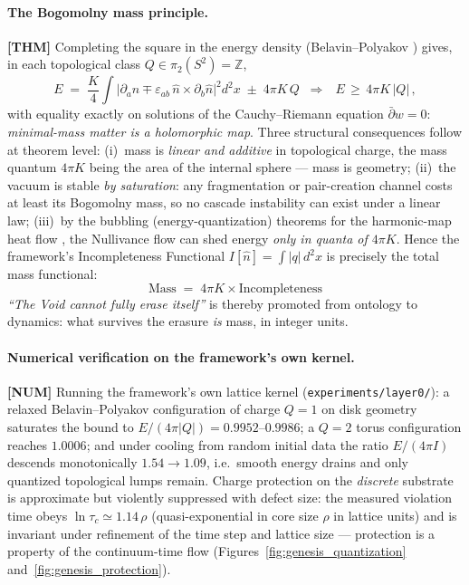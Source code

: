 \paragraph{The Bogomolny mass principle.} \textbf{[THM]} Completing the square in the energy
density (Belavin--Polyakov \cite{BP1975}) gives, in each topological class
$Q\in\pi_2(S^2)=\mathbb{Z}$,
\begin{equation}
E \;=\; \frac{K}{4}\!\int\! \big|\partial_a \hat n \mp \varepsilon_{ab}\,\hat n\times\partial_b \hat n\big|^2 d^2x
\;\pm\; 4\pi K\, Q
\;\;\Longrightarrow\;\;
\boxed{\,E \,\ge\, 4\pi K\,|Q|\,},
\label{eq:bogomolny}
\end{equation}
with equality exactly on solutions of the Cauchy--Riemann equation $\bar\partial w=0$:
\emph{minimal-mass matter is a holomorphic map}. Three structural consequences follow at
theorem level: (i)~mass is \emph{linear and additive} in topological charge, the mass quantum
$4\pi K$ being the area of the internal sphere --- mass is geometry; (ii)~the vacuum is stable
\emph{by saturation}: any fragmentation or pair-creation channel costs at least its Bogomolny
mass, so no cascade instability can exist under a linear law; (iii)~by the bubbling
(energy-quantization) theorems for the harmonic-map heat flow \cite{Struwe1985,Qing1995},
the Nullivance flow can shed energy \emph{only in quanta of $4\pi K$}. Hence the framework's
Incompleteness Functional $I[\hat n]=\int |q|\,d^2x$ is precisely the total mass functional:
\begin{equation}
\boxed{\;\mathrm{Mass} \;=\; 4\pi K \times \mathrm{Incompleteness}\;}
\label{eq:massincompleteness}
\end{equation}
\emph{``The Void cannot fully erase itself''} is thereby promoted from ontology to dynamics:
what survives the erasure \emph{is} mass, in integer units.

\paragraph{Numerical verification on the framework's own kernel.} \textbf{[NUM]}
Running the framework's own lattice kernel (\texttt{experiments/layer0/}): a relaxed
Belavin--Polyakov configuration of charge $Q=1$ on disk geometry saturates the bound to
$E/(4\pi|Q|)=0.9952\text{--}0.9986$; a $Q=2$ torus configuration reaches $1.0006$; and under
cooling from random initial data the ratio $E/(4\pi I)$ descends monotonically
$1.54\to1.09$, i.e.\ smooth energy drains and only quantized topological lumps remain.
Charge protection on the \emph{discrete} substrate is approximate but violently suppressed
with defect size: the measured violation time obeys $\ln \tau_c \simeq 1.14\,\rho$
(quasi-exponential in core size $\rho$ in lattice units) and is invariant under refinement of
the time step and lattice size --- protection is a property of the continuum-time flow
(Figures~\ref{fig:genesis_quantization} and~\ref{fig:genesis_protection}).

